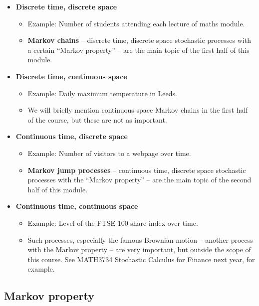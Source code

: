 \documentclass[
  a4paper,
]{article}
\providecommand{\tightlist}{%
  \setlength{\itemsep}{0pt}\setlength{\parskip}{0pt}}
\theoremstyle{definition}
\theoremstyle{definition}
\theoremstyle{definition}
\theoremstyle{remark}
\begin{document}
\begin{itemize}
\tightlist
\item
  \textbf{Discrete time, discrete space}

  \begin{itemize}
  \tightlist
  \item
    Example: Number of students attending each lecture of maths module.
  \item
    \textbf{Markov chains} -- discrete time, discrete space stochastic processes with a certain ``Markov property'' -- are the main topic of the first half of this module.
  \end{itemize}
\item
  \textbf{Discrete time, continuous space}

  \begin{itemize}
  \tightlist
  \item
    Example: Daily maximum temperature in Leeds.
  \item
    We will briefly mention continuous space Markov chains in the first half of the course, but these are not as important.
  \end{itemize}
\item
  \textbf{Continuous time, discrete space}

  \begin{itemize}
  \tightlist
  \item
    Example: Number of visitors to a webpage over time.
  \item
    \textbf{Markov jump processes} -- continuous time, discrete space stochastic processes with the ``Markov property'' -- are the main topic of the second half of this module.
  \end{itemize}
\item
  \textbf{Continuous time, continuous space}

  \begin{itemize}
  \tightlist
  \item
    Example: Level of the FTSE 100 share index over time.
  \item
    Such processes, especially the famous Brownian motion -- another process with the Markov property -- are very important, but outside the scope of this course. See MATH3734 Stochastic Calculus for Finance next year, for example.
  \end{itemize}
\end{itemize}

\hypertarget{markov-property}{%
\subsection{Markov property}\label{markov-property}}
\end{document}
